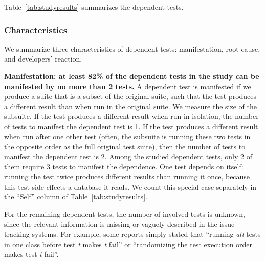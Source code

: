 

Table~\ref{tab:studyresults} summarizes the dependent tests.


\subsubsection{Characteristics}


We summarize three characteristics of dependent tests:
manifestation, root cause, and developers' reaction.

\vspace{1mm}
\noindent \textbf{{Manifestation: at least 82\% of the dependent
tests in the study can be manifested by no more than 2 tests.}}
A dependent test is manifested if we produce a suite that is a 
subset of the original suite, such that the test produces a different
result than when run in the original suite.
We measure the size of the subsuite.
If the test produces a different result when run
in isolation, the number of tests to manifest
the dependent test is 1.
If the test produces a different result
when run after one other test (often, the subsuite is
running these two tests in the opposite order as the full original test
suite), then the number of tests to manifest the dependent test is 2.
Among the \dtnum studied dependent tests, only 2 of them
require 3 tests to manifest the dependence.
One test depends on itself:
running the test twice produces different results than running it once,
because this test side-effects a database it reads.
We count this special case separately in the ``Self'' column
of Table~\ref{tab:studyresults}.

For the remaining \unum dependent tests, the number of involved tests
is unknown, since the relevant information is missing
or vaguely described in the issue tracking systems. For example,
some reports simply stated that ``running \textit{all} tests in one class before
test \emph{t} makes \emph{t} fail'' or ``randomizing the test execution order
makes test \emph{t} fail''.





